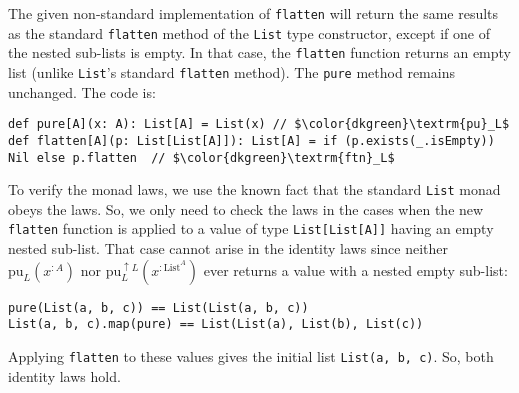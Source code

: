 The
given non-standard implementation of \lstinline!flatten! will return
the same results as the standard \lstinline!flatten! method of the
\lstinline!List! type constructor, except if one of the nested sub-lists
is empty. In that case, the \lstinline!flatten! function returns
an empty list (unlike \lstinline!List!\textsf{'}s standard \lstinline!flatten!
method). The \lstinline!pure! method remains unchanged. The code
is:
\begin{lstlisting}[mathescape=true]
def pure[A](x: A): List[A] = List(x) // $\color{dkgreen}\textrm{pu}_L$
def flatten[A](p: List[List[A]]): List[A] = if (p.exists(_.isEmpty)) Nil else p.flatten  // $\color{dkgreen}\textrm{ftn}_L$
\end{lstlisting}

To verify the monad laws, we use the known fact that the standard
\lstinline!List! monad obeys the laws. So, we only need to check
the laws in the cases when the new \lstinline!flatten! function is
applied to a value of type \lstinline!List[List[A]]! having an empty
nested sub-list. That case cannot arise in the identity laws since
neither $\text{pu}_{L}(x^{:A})$ nor $\text{pu}_{L}^{\uparrow L}(x^{:\text{List}^{A}})$
ever returns a value with a nested empty sub-list:
\begin{lstlisting}
pure(List(a, b, c)) == List(List(a, b, c))
List(a, b, c).map(pure) == List(List(a), List(b), List(c))
\end{lstlisting}
Applying \lstinline!flatten! to these values gives the initial list
\lstinline!List(a, b, c)!. So, both identity laws hold.

